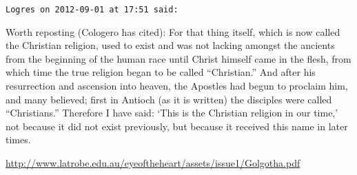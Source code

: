 \begin{footnotesize}
\begin{sffamily}
\texttt{Logres on 2012-09-01 at 17:51 said:}

Worth reposting (Cologero has cited): For that thing itself, which is now called the Christian religion, used to exist and was not lacking amongst the ancients from the beginning of the human race until Christ himself came in the flesh, from which time the true religion began to be called ``Christian.'' And after his resurrection and ascension into heaven, the Apostles had begun to proclaim him, and many believed; first in Antioch (as it is written) the disciples were called ``Christians.'' Therefore I have said: `This is the Christian religion in our time,' not because it did not exist previously, but because it received this name in later times.

\url{http://www.latrobe.edu.au/eyeoftheheart/assets/issue1/Golgotha.pdf}



\hfill

\end{sffamily}
\end{footnotesize}

